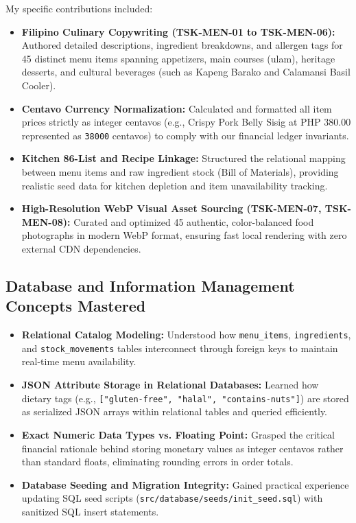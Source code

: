 My specific contributions included:
\begin{itemize}
    \item \textbf{Filipino Culinary Copywriting (TSK-MEN-01 to TSK-MEN-06):} Authored detailed descriptions, ingredient breakdowns, and allergen tags for 45 distinct menu items spanning appetizers, main courses (ulam), heritage desserts, and cultural beverages (such as Kapeng Barako and Calamansi Basil Cooler).
    \item \textbf{Centavo Currency Normalization:} Calculated and formatted all item prices strictly as integer centavos (e.g., Crispy Pork Belly Sisig at PHP 380.00 represented as \texttt{38000} centavos) to comply with our financial ledger invariants.
    \item \textbf{Kitchen 86-List and Recipe Linkage:} Structured the relational mapping between menu items and raw ingredient stock (Bill of Materials), providing realistic seed data for kitchen depletion and item unavailability tracking.
    \item \textbf{High-Resolution WebP Visual Asset Sourcing (TSK-MEN-07, TSK-MEN-08):} Curated and optimized 45 authentic, color-balanced food photographs in modern WebP format, ensuring fast local rendering with zero external CDN dependencies.
\end{itemize}

\subsection{Database and Information Management Concepts Mastered}
\begin{itemize}
    \item \textbf{Relational Catalog Modeling:} Understood how \texttt{menu\_items}, \texttt{ingredients}, and \texttt{stock\_movements} tables interconnect through foreign keys to maintain real-time menu availability.
    \item \textbf{JSON Attribute Storage in Relational Databases:} Learned how dietary tags (e.g., \texttt{["gluten-free", "halal", "contains-nuts"]}) are stored as serialized JSON arrays within relational tables and queried efficiently.
    \item \textbf{Exact Numeric Data Types vs. Floating Point:} Grasped the critical financial rationale behind storing monetary values as integer centavos rather than standard floats, eliminating rounding errors in order totals.
    \item \textbf{Database Seeding and Migration Integrity:} Gained practical experience updating SQL seed scripts (\texttt{src/database/seeds/init\_seed.sql}) with sanitized SQL insert statements.
\end{itemize}

